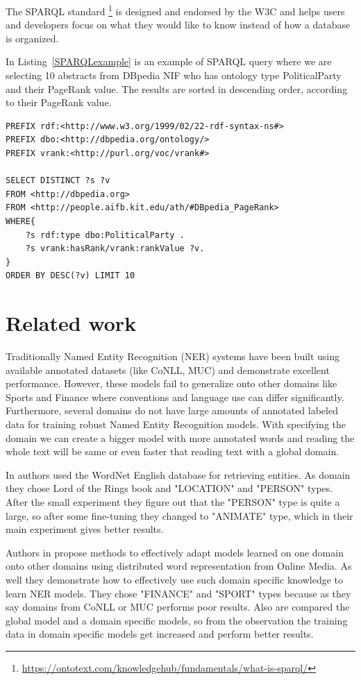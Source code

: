\documentclass[thesis=M,english]{FITthesis}[2018/05/30]
\begin{document}
	The SPARQL standard \footnote{\url{https://ontotext.com/knowledgehub/fundamentals/what-is-sparql/}} is designed and endorsed by the W3C and helps users and developers focus on what they would like to know instead of how a database is organized.

	In Listing~\ref{SPARQLexample} is an example of SPARQL query where we are selecting 10 abstracts from DBpedia NIF who has ontology type PoliticalParty and their PageRank value. The results are sorted in descending order, according to their PageRank value.   
	
\begin{lstlisting}[caption=SPARQL example \label{SPARQLexample},captionpos=b]
PREFIX rdf:<http://www.w3.org/1999/02/22-rdf-syntax-ns#>
PREFIX dbo:<http://dbpedia.org/ontology/>
PREFIX vrank:<http://purl.org/voc/vrank#>

SELECT DISTINCT ?s ?v
FROM <http://dbpedia.org>
FROM <http://people.aifb.kit.edu/ath/#DBpedia_PageRank>
WHERE{
	?s rdf:type dbo:PoliticalParty .
	?s vrank:hasRank/vrank:rankValue ?v.
}
ORDER BY DESC(?v) LIMIT 10
\end{lstlisting}

\section{Related work}
	Traditionally Named Entity Recognition (NER)\cite{article:DomainSpecific} systems have been built using available annotated datasets (like CoNLL, MUC) and demonstrate excellent performance. However, these models fail to generalize onto other domains like Sports and Finance where conventions and language use can differ significantly. Furthermore, several domains do not have large amounts of annotated labeled data for training robust Named Entity Recognition models.
With specifying the domain we can create a bigger model with more annotated words and reading the whole text will be same or even faster that reading text with a global domain.  

	In \cite{RelatedWork:Alfonseca02anunsupervised} authors used the WordNet English database for retrieving entities. As domain they chose Lord of the Rings book and  "LOCATION" and "PERSON" types. After the small experiment they figure out that the "PERSON" type is quite a large, so after some fine-tuning they changed to "ANIMATE" type, which in their main experiment gives better results.

	Authors in \cite{RelatedWork:OnlineMedia} propose methods to effectively adapt models learned on one domain onto other domains using distributed word representation from Online Media. As well they demonstrate how to effectively use such domain specific knowledge to learn NER models. They chose "FINANCE" and "SPORT" types because as they say domains from CoNLL or MUC performs poor results. Also are compared the global model and a domain specific models, so from the observation the training data in domain specific models get increased and perform better results.
 
\end{document}
